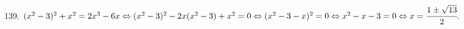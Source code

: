 139. $(x^2-3)^2+x^2=2x^3-6x\Leftrightarrow(x^2-3)^2-2x(x^2-3)+x^2=0\Leftrightarrow (x^2-3-x)^2=0\Leftrightarrow x^2-x-3=0\Leftrightarrow x=\cfrac{1\pm\sqrt{13}}{2}.$\\
